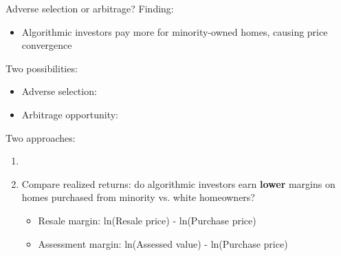 \documentclass[aspectratio=169,t,11pt,table]{beamer}
\begin{document}
\begin{frame}{Adverse selection or arbitrage?}\label{adversesetup_premargin} \small
Finding:
\begin{itemize} \footnotesize
    \item  Algorithmic investors pay more for minority-owned homes, causing price convergence 
\end{itemize}
\vspace{1mm}
Two possibilities:

\begin{itemize} \footnotesize
    \item  Adverse selection:   
    \item  Arbitrage opportunity:  
\end{itemize} 
\vspace{1mm}
Two approaches:
\begin{enumerate} \footnotesize
    \item {} 
    \item  Compare realized returns: do algorithmic investors earn \textbf{lower} margins on homes purchased from minority vs. white homeowners? 
        \begin{itemize} \footnotesize
            \item Resale margin: ln(Resale price) - ln(Purchase price)
            \item Assessment margin: ln(Assessed value) - ln(Purchase price)
        \end{itemize}
\end{enumerate} 
\end{frame}
\end{document}

